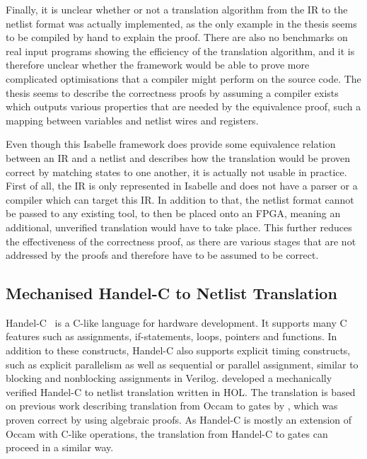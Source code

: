 Finally, it is unclear whether or not a translation algorithm from the IR to the
netlist format was actually implemented, as the only example in the thesis seems
to be compiled by hand to explain the proof.  There are also no benchmarks on
real input programs showing the efficiency of the translation algorithm, and it
is therefore unclear whether the framework would be able to prove more
complicated optimisations that a compiler might perform on the source code.  The
thesis seems to describe the correctness proofs by assuming a compiler exists
which outputs various properties that are needed by the equivalence proof, such
a mapping between variables and netlist wires and registers.

Even though this Isabelle framework does provide some equivalence relation
between an IR and a netlist and describes how the translation would be proven
correct by matching states to one another, it is actually not usable in
practice.  First of all, the IR is only represented in Isabelle and does not
have a parser or a compiler which can target this IR.  In addition to that, the
netlist format cannot be passed to any existing tool, to then be placed onto an
\gls{FPGA}, meaning an additional, unverified translation would have to take
place.  This further reduces the effectiveness of the correctness proof, as
there are various stages that are not addressed by the proofs and therefore have
to be assumed to be correct.

\subsection{Mechanised Handel-C to Netlist Translation}%
\label{sec:bg:mechaniced-handel-c-to-netlist-translation}

Handel-C~\cite{bowen98_hclrm} is a C-like language for hardware development.  It
supports many C features such as assignments, if-statements, loops, pointers and
functions.  In addition to these constructs, Handel-C also supports explicit
timing constructs, such as explicit parallelism as well as sequential or
parallel assignment, similar to blocking and nonblocking assignments in Verilog.
\textcite{perna12_mechan_wire_wise_verif_handel_c_synth} developed a
mechanically verified Handel-C to netlist translation written in HOL. The
translation is based on previous work describing translation from Occam to gates
by \textcite{page91_compil_occam}, which was proven correct by
\textcite{jifeng93_towar} using algebraic proofs.  As Handel-C is mostly an
extension of Occam with C-like operations, the translation from Handel-C to
gates can proceed in a similar way.


